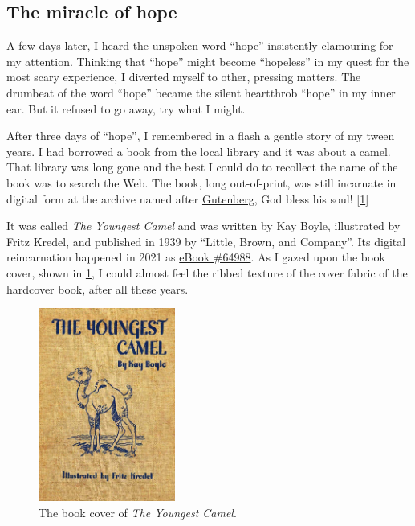 \documentclass[
  a4paper,
]{article}
\begin{document}
\hypertarget{the-miracle-of-hope}{%
\subsection{The miracle of hope}\label{the-miracle-of-hope}}

A few days later, I heard the unspoken word ``hope'' insistently
clamouring for my attention. Thinking that ``hope'' might become
``hopeless'' in my quest for the most scary experience, I diverted
myself to other, pressing matters. The drumbeat of the word ``hope''
became the silent heartthrob ``hope'' in my inner ear. But it refused to
go away, try what I might.

After three days of ``hope'', I remembered in a flash a gentle story of
my tween years. I had borrowed a book from the local library and it was
about a camel. That library was long gone and the best I could do to
recollect the name of the book was to search the Web. The book, long
out-of-print, was still incarnate in digital form at the archive named
after
\href{https://www.newworldencyclopedia.org/entry/Johannes_Gutenberg}{Gutenberg},
God bless his soul! {[}\protect\hyperlink{ref-boyle1939}{1}{]}

It was called \emph{The Youngest Camel} and was written by Kay Boyle,
illustrated by Fritz Kredel, and published in 1939 by ``Little, Brown,
and Company''. Its digital reincarnation happened in 2021 as
\href{https://www.gutenberg.org/files/64988/64988-h/64988-h.htm}{eBook
\#64988}. As I gazed upon the book cover, shown in \cref{fig:camel}, I
could almost feel the ribbed texture of the cover fabric of the
hardcover book, after all these years.

\begin{figure}
\hypertarget{fig:camel}{%
\centering
\includegraphics[width=0.4\textwidth,height=\textheight]{images/camel.jpg}
\caption{The book cover of \emph{The Youngest Camel}.}\label{fig:camel}
}
\end{figure}
\end{document}
